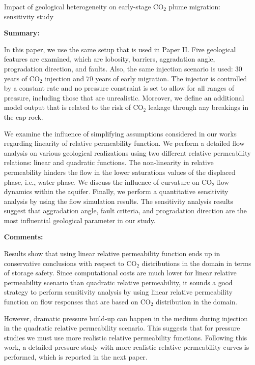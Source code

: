 %
%
{Impact of geological heterogeneity on early-stage $\mbox{CO}_2$ plume
migration: sensitivity study}
{%
\textbf{Summary:}

In this paper, we use the same setup that is used in Paper II. Five
geological features are examined, which are lobosity, barriers, aggradation
angle, progradation direction, and faults. Also, the same injection scenario is
used: $30$ years of $\mbox{CO}_2$ injection and $70$ years of early migration.
The injector is controlled by a constant rate and no pressure constraint is set
to allow for all ranges of pressure, including those that are unrealistic.
Moreover, we define an additional model output that is related to the risk of
CO$_2$ leakage through any breakings in the cap-rock.

We examine the influence of simplifying assumptions considered in our works
regarding linearity of relative permeability function. We perform a detailed
flow analysis on various geological realizations using two different relative
permeability relations: linear and quadratic functions. The non-linearity in
relative permeability hinders the flow in the lower saturations values of the
displaced phase, i.e., water phase. We discuss the influence of curvature on
$\mbox{CO}_2$ flow dynamics within the aquifer. Finally, we perform a quantitative sensitivity analysis by using the flow simulation results. The sensitivity analysis results suggest that aggradation angle, fault criteria, and progradation direction are the most influential geological parameter in our study.

\vspace{0.5cm}
\noindent\textbf{Comments:}

Results show that using linear relative permeability function ends up in
conservative conclusions with respect to $\mbox{CO}_2$ distributions in the
domain in terms of storage safety. Since computational costs are much lower for
linear relative permeability scenario than quadratic relative permeability, it
sounds a good strategy to perform sensitivity analysis by using linear relative
permeability function on flow responses that are based on $\mbox{CO}_2$
distribution in the domain.

However, dramatic pressure build-up can happen in the medium during injection
in the quadratic relative permeability scenario. This suggests that for
pressure studies we must use more realistic relative permeability functions.
 Following this work, a detailed pressure study with more realistic relative
permeability curves is performed, which is reported in the next paper.

}
